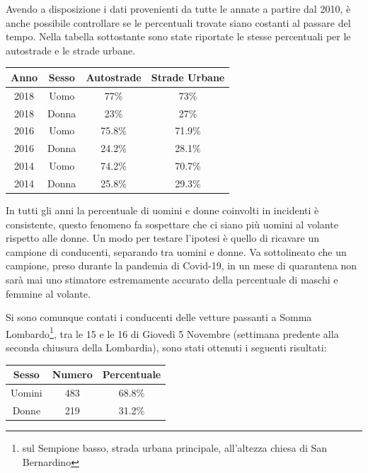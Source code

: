\documentclass[a4paper,12pt]{report}
\begin{document}
Avendo a disposizione i dati provenienti da tutte le annate a partire dal 2010, 
è anche possibile controllare se le percentuali trovate siano costanti al 
passare del tempo.
Nella tabella sottostante sono state riportate le stesse percentuali per le 
autostrade e le strade urbane.

\begin{center}
    \def\arraystretch{1.5}%
    \begin{tabular}{ |c|c|c|c| }
        \hline
        Anno & Sesso & Autostrade & Strade Urbane \\ 
        \hline
        \rowcolor{TableGray}
        2018 & Uomo & 77\%  & 73\% \\
        2018 & Donna & 23\% & 27\% \\
        \rowcolor{TableGray}
        2016 & Uomo & 75.8\%  & 71.9\% \\
        2016 & Donna & 24.2\% & 28.1\% \\
        \rowcolor{TableGray}
        2014 & Uomo & 74.2\%  & 70.7\% \\
        2014 & Donna & 25.8\% & 29.3\% \\
        \hline
    \end{tabular}
\end{center}

In tutti gli anni la percentuale di uomini e donne coinvolti in incidenti è consistente, 
questo fenomeno fa sospettare che ci siano più uomini al volante rispetto alle donne.
Un modo per testare l'ipotesi è quello di ricavare un campione di conducenti, 
separando tra uomini e donne.
Va sottolineato che un campione, preso durante la pandemia di Covid-19, in un 
mese di quarantena non sarà mai uno stimatore estremamente accurato della percentuale 
di maschi e femmine al volante.

Si sono comunque contati i conducenti delle vetture passanti a Somma 
Lombardo\footnote{sul Sempione basso, strada urbana principale, all'altezza 
chiesa di San Bernardino}, 
tra le 15 e le 16 di Giovedì 5 Novembre 
(settimana predente alla seconda chiusura della Lombardia), 
sono stati ottenuti i seguenti risultati:

\begin{center}
    \def\arraystretch{1.5}%
    \begin{tabular}{ |c|c|c| }
        \hline
        Sesso & Numero & Percentuale \\ 
        \hline
        \rowcolor{TableGray}
        Uomini & 483 & 68.8\% \\
        Donne & 219 & 31.2\% \\
        \hline
    \end{tabular}
\end{center}
\end{document}
